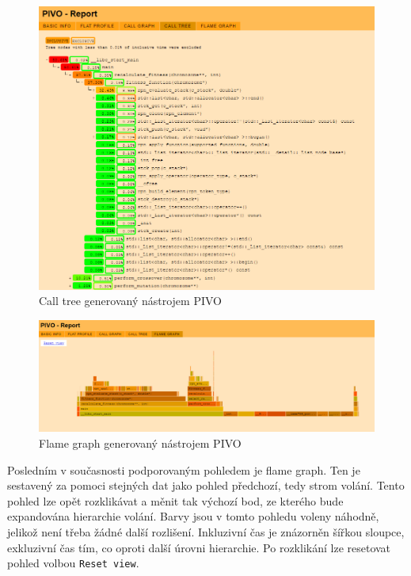\documentclass[czech,BP]{thesiskiv}
\begin{document}
\begin{figure}[h]
    \centering
    \includegraphics[interpolate,width=1.0\textwidth]{img/pivo_tree.png}
    \caption{Call tree generovaný nástrojem PIVO}
    \label{obr:impltree}
\end{figure}

\begin{figure}[h]
    \centering
    \includegraphics[interpolate,width=1.0\textwidth]{img/pivo_flame.png}
    \caption{Flame graph generovaný nástrojem PIVO}
    \label{obr:implflame}
\end{figure}

Posledním v současnosti podporovaným pohledem je flame graph. Ten je sestavený za pomoci stejných dat jako pohled předchozí, tedy strom volání. Tento pohled lze opět rozklikávat a měnit tak výchozí bod, ze kterého bude expandována hierarchie volání. Barvy jsou v tomto pohledu voleny náhodně, jelikož není třeba žádné další rozlišení. Inkluzivní čas je znázorněn šířkou sloupce, exkluzivní čas tím, co  oproti další úrovni hierarchie. Po rozklikání lze resetovat pohled volbou \texttt{Reset view}.
\end{document}
